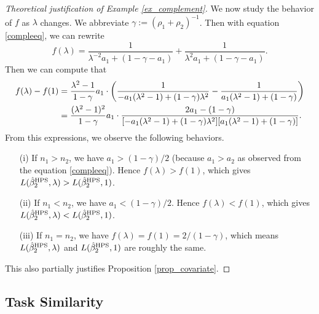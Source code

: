 \begin{proof}[Theoretical justification of Example \ref{ex_complement}]
We now study the behavior of $f$ as $\lambda$ changes. 
We abbreviate $\gamma:=(\rho_1 + \rho_2)^{-1}$. Then with equation \eqref{compleeq}, we can rewrite
$$f(\lambda)= \frac{1}{\lambda^{-2}{a_1} + (1-\gamma - a_1)} + \frac{1}{\lambda^2a_1 + (1-\gamma - a_1)}.$$
Then we can compute that
\begin{align*}
f(\lambda) - f(1)&= \frac{ \lambda^2-1}{1-\gamma} a_1\cdot \left({  \frac{1}{ -a_1(\lambda^2-1)+(1-\gamma)\lambda^2 } - \frac{1}{a_1(\lambda^2-1) + (1-\gamma)}}\right) \\
&= \frac{(\lambda^2-1)^2}{1-\gamma}  a_1\cdot  \frac{2a_1 - (1-\gamma) }{[-a_1(\lambda^2-1)+(1-\gamma)\lambda^2 ][a_1(\lambda^2-1) + (1-\gamma)]} .
\end{align*}
From this expressions, we observe the following behaviors.
\begin{itemize}
\item[(i)] If $n_1>n_2$, we have $a_1>(1-\gamma)/2$ (because $a_1>a_2$ as observed from the equation \eqref{compleeq}). Hence $f(\lambda)>f(1)$, which gives $L(\hat \beta_{2}^{\textup{HPS}},\lambda)>L(\hat \beta_{2}^{\textup{HPS}},1)$.

\item[(ii)] If $n_1< n_2$, we have $a_1< (1-\gamma)/2$. Hence $f(\lambda)< f(1)$, which gives $L(\hat \beta_{2}^{\textup{HPS}},\lambda)<L(\hat \beta_{2}^{\textup{HPS}},1)$. 

\item[(iii)] If $n_1=n_2$, we have $f(\lambda)=f(1)=2/(1-\gamma)$, which means $L(\hat \beta_{2}^{\textup{HPS}},\lambda)$ and $L(\hat \beta_{2}^{\textup{HPS}},1)$ are roughly the same. %
\end{itemize}
This also partially justifies Proposition \ref{prop_covariate}. %
\end{proof}
\fi
 


\iffalse
\subsection{Task Similarity}\label{app_proof_31}

